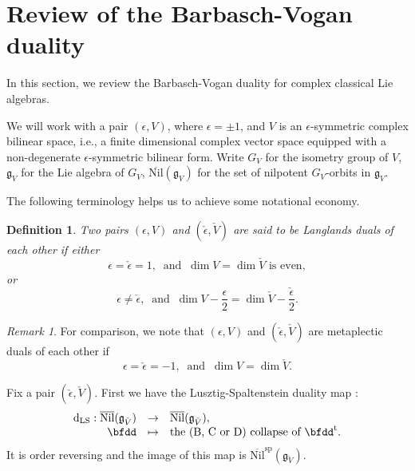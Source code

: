 \documentclass[12pt,a4paper]{amsart}
\newcommand{\g}{\mathfrak g}
\newcommand{\be}{\begin {equation}}
\newcommand{\ee}{\end {equation}}
\numberwithin{equation}{section}
\newtheorem{dfnl}[thm]{Definition}
\theoremstyle{remark}
\newtheorem*{remark}{Remark}
\begin{document}
\section{Review of the Barbasch-Vogan duality}

In this section, we review the Barbasch-Vogan duality for complex classical Lie algebras.

We will work with a pair $(\epsilon, V)$, where $\epsilon=\pm 1$, and $V$ is an $\epsilon$-symmetric complex bilinear space, i.e., a finite dimensional complex vector space equipped with a non-degenerate $\epsilon$-symmetric bilinear form. Write $G_V$ for the isometry group of $V$, $\g_V$  for the Lie algebra of $G_V$, $\overline{\mathrm{Nil}}(\g_{V})$ for the set of nilpotent $G_V$-orbits in $\g_{V}$.

The following terminology helps us to achieve some notational economy.

\begin{dfnl}  Two pairs $(\epsilon, V)$ and $(\check \epsilon, \check V)$ are said to be Langlands duals of each other if either
\[
  \textrm{$\epsilon=\check \epsilon=1, \ $  and $\ \dim V=\dim \check V$ is even},
\]
or
\[
  \textrm{$\epsilon\neq \check \epsilon,\ $  and $\ \dim V-\frac{\epsilon}{2}=\dim \check V-\frac{\check \epsilon}{2}$}.
\]
\end{dfnl}

\begin{remark} For comparison, we note that $(\epsilon, V)$ and $(\check \epsilon, \check V)$ are metaplectic duals of each other if
\[
  \textrm{$\epsilon=\check \epsilon=-1, \ $  and $\ \dim V=\dim \check V$}.
\]
\end{remark}

Fix a pair $(\check \epsilon, \check V)$. First we have the Lusztig-Spaltenstein duality map \cite{Spa}:
\be\label{dls}
\begin{array}{rcl}
   \mathrm d_{\mathrm{LS}}:  \overline{\mathrm{Nil}}(\g_{\check V})&\rightarrow &\overline{\mathrm{Nil}}(\g_{\check V}),\\
     \bfdd&\mapsto&  \textrm{the (B, C or D) collapse of  $\bfdd^{\mathrm t}$}.
     \end{array}
\ee
It is order reversing and the image of this map is $\overline{\mathrm{Nil}}^{\mathrm{sp}}(\g_{\check V})$.
\end{document}
